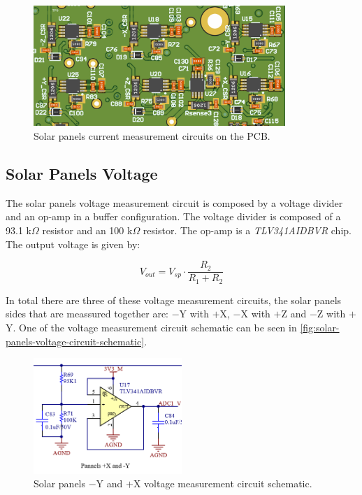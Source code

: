 \begin{figure}[!ht]
    \begin{center}
        \includegraphics[width=0.85\textwidth]{figures/solar-panels-current-circuit-3d.png}
        \caption{Solar panels current measurement circuits on the PCB.}
        \label{fig:solar-panels-current-circuit-3d}
    \end{center}
\end{figure}


\subsection{Solar Panels Voltage}

The solar panels voltage measurement circuit is composed by a voltage divider and an op-amp in a buffer configuration. The voltage divider is composed of a 93.1 k$\Omega$ resistor and an 100 k$\Omega$ resistor. The op-amp is a \textit{TLV341AIDBVR} chip. The output voltage is given by:

\begin{equation}
V_{out} = V_{sp} \cdot \frac{R_{2}}{R_{1} + R_{2}}
\end{equation}

In total there are three of these voltage measurement circuits, the solar panels sides that are meassured together are: $-$Y with $+$X, $-$X with $+$Z and $-$Z with $+$Y.
One of the voltage measurement circuit schematic can be seen in \autoref{fig:solar-panels-voltage-circuit-schematic}.

\begin{figure}[!ht]
    \begin{center}
        \includegraphics[width=0.5\textwidth]{figures/solar-panels-voltage-circuit-schematic}
        \caption{Solar panels $-$Y and $+$X voltage measurement circuit schematic.}
        \label{fig:solar-panels-voltage-circuit-schematic}
    \end{center}
\end{figure}

